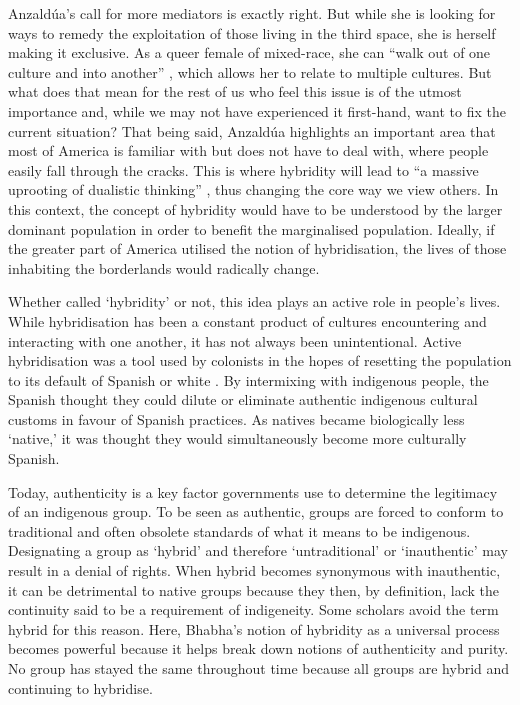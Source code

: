 	Anzaldúa’s call for more mediators \parencite [78] {Anzaldua_1987}  is exactly right. But while she is looking for ways to remedy the exploitation of those living in the third space, she is herself making it exclusive. As a queer female of mixed-race, she can “walk out of one culture and into another” \parencite [77] {Anzaldua_1987}, which allows her to relate to multiple cultures. But what does that mean for the rest of us who feel this issue is of the utmost importance and, while we may not have experienced it first-hand, want to fix the current situation? That being said, Anzaldúa highlights an important area that most of America is familiar with but does not have to deal with, where people easily fall through the cracks. This is where hybridity will lead to “a massive uprooting of dualistic thinking” \parencite [80] {Anzaldua_1987}, thus changing the core way we view others. In this context, the concept of hybridity would have to be understood by the larger dominant population in order to benefit the marginalised population. Ideally, if the greater part of America utilised the notion of hybridisation, the lives of those inhabiting the borderlands would radically change. 
	
	Whether called ‘hybridity’ or not, this idea plays an active role in people’s lives. While hybridisation has been a constant product of cultures encountering and interacting with one another, it has not always been unintentional. Active hybridisation was a tool used by colonists in the hopes of resetting the population to its default of Spanish or white \parencite [42] {Warren_1998}. By intermixing with indigenous people, the Spanish thought they could dilute or eliminate authentic indigenous cultural customs in favour of Spanish practices. As natives became biologically less ‘native,’ it was thought they would simultaneously become more culturally Spanish. 
	
	Today, authenticity is a key factor governments use to determine the legitimacy of an indigenous group.  To be seen as authentic, groups are forced to conform to traditional and often obsolete standards of what it means to be indigenous. Designating a group as ‘hybrid’ and therefore ‘untraditional’ or ‘inauthentic’ may result in a denial of rights. When hybrid becomes synonymous with inauthentic, it can be detrimental to native groups because they then, by definition, lack the continuity said to be a requirement of indigeneity. Some scholars avoid the term hybrid for this reason. Here, Bhabha’s notion of hybridity as a universal process becomes powerful because it helps break down notions of authenticity and purity. No group has stayed the same throughout time because all groups are hybrid and continuing to hybridise.
	

